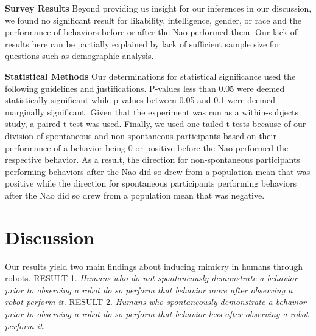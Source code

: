 \documentclass{acm_proc_article-sp}
\begin{document}
\textbf{Survey Results} Beyond providing us insight for our inferences in our discussion, we found no significant result for likability, intelligence, gender, or race and the performance of behaviors before or after the Nao performed them. Our lack of results here can be partially explained by lack of sufficient sample size for questions such as demographic analysis.

\textbf{Statistical Methods} Our determinations for statistical significance used the following guidelines and justifications. P-values less than 0.05 were deemed statistically significant while p-values between 0.05 and 0.1 were deemed marginally significant. Given that the experiment was run as a within-subjects study, a paired t-test was used. Finally, we used one-tailed t-tests because of our division of spontaneous and non-spontaneous participants based on their performance of a behavior being 0 or positive before the Nao performed the respective behavior. As a result, the direction for non-spontaneous participants performing behaviors after the Nao did so drew from a population mean that was positive while the direction for spontaneous participants performing behaviors after the Nao did so drew from a population mean that was negative.

\section{Discussion}
Our results yield two main findings about inducing mimicry in humans through robots.
RESULT 1. \textit{Humans who do not spontaneously demonstrate a behavior prior to observing a robot do so perform that behavior more after observing a robot perform it.}
RESULT 2. \textit{Humans who spontaneously demonstrate a behavior prior to observing a robot do so perform that behavior less after observing a robot perform it.}
\end{document}
